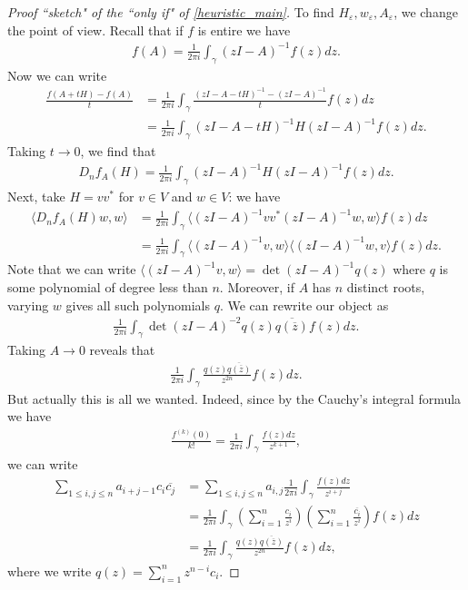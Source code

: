 \begin{proof}[Proof ``sketch" of the ``only if" of \ref{heuristic_main}]
	To find $H_{\varepsilon}, w_{\varepsilon}, A_{\varepsilon}$, we change the point of view. Recall that if $f$ is entire we have
	\begin{align*}
	f(A) = \frac{1}{2 \pi i}\int_{\gamma} (z I - A)^{-1} f(z) dz.
	\end{align*}
	Now we can write
	\begin{align*}
		\frac{f(A + t H) - f(A)}{t} &= \frac{1}{2 \pi i}\int_{\gamma} \frac{(z I - A - t H)^{-1} - (z I - A)^{-1}}{t} f(z) dz \\
		&= \frac{1}{2 \pi i}\int_{\gamma} (z I - A - t H)^{-1} H (z I - A)^{-1} f(z) dz.
	\end{align*}
	Taking $t \to 0$, we find that
	\begin{align*}
		D_{n} f_{A}(H) = \frac{1}{2 \pi i}\int_{\gamma} (z I - A)^{-1} H (z I - A)^{-1} f(z) dz.
	\end{align*}
	Next, take $H = v v^{*}$ for $v \in V$ and $w \in V$: we have
	\begin{align*}
		\langle D_{n} f_{A}(H) w, w \rangle &= \frac{1}{2 \pi i}\int_{\gamma} \langle (z I - A)^{-1} v v^{*} (z I - A)^{-1} w, w \rangle f(z) dz \\
		&= \frac{1}{2 \pi i}\int_{\gamma} \langle (z I - A)^{-1} v, w \rangle \langle (z I - A)^{-1} w, v \rangle f(z) dz.
	\end{align*}
	Note that we can write $\langle (z I - A)^{-1} v, w \rangle = \det(z I - A)^{-1} q(z)$ where $q$ is some polynomial of degree less than $n$. Moreover, if $A$ has $n$ distinct roots, varying $w$ gives all such polynomials $q$. We can rewrite our object as
	\begin{align*}
		\frac{1}{2 \pi i}\int_{\gamma} \det(z I - A)^{-2} q(z) \overline{q(\overline{z})} f(z) dz.
	\end{align*}
	Taking $A \to 0$ reveals that
	\begin{align*}
		\frac{1}{2 \pi i}\int_{\gamma} \frac{q(z) \overline{q(\overline{z})}}{z^{2 n}} f(z) dz.
	\end{align*}
	But actually this is all we wanted. Indeed, since by the Cauchy's integral formula we have
	\begin{align*}
		\frac{f^{(k)}(0)}{k!} = \frac{1}{2 \pi i} \int_{\gamma} \frac{f(z) d z}{z^{k + 1}},
	\end{align*}
	we can write
	\begin{align*}
		\sum_{1 \leq i, j \leq n} a_{i + j - 1} c_{i} \overline{c_{j}} &= \sum_{1 \leq i, j \leq n} a_{i, j} \frac{1}{2 \pi i} \int_{\gamma} \frac{f(z) d z}{z^{i + j}} \\
		&= \frac{1}{2 \pi i} \int_{\gamma} \left(\sum_{i = 1}^{n} \frac{c_{i}}{z^{i}} \right) \left(\sum_{i = 1}^{n} \frac{\overline{c_{i}}}{z^{i}} \right)f(z) dz \\
		&= \frac{1}{2 \pi i} \int_{\gamma}  \frac{q(z) \overline{q(\overline{z})}}{z^{2 n}} f(z) dz,
	\end{align*}
	where we write $q(z) = \sum_{i = 1}^{n} z^{n - i} c_{i}$.
\end{proof}

